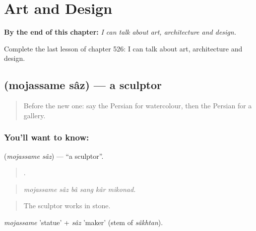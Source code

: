 
\chapter{Art and Design}
\label{ch:fa-art-and-design}

\begin{chapteropening}
\textbf{By the end of this chapter:} \emph{I can talk about art, architecture and design.}

Complete the last lesson of chapter 526: I can talk about art, architecture and design.
\end{chapteropening}

\section[\texorpdfstring{\fa{مجسمه} \fa{ساز} (mojassame sâz)}{مجسمه ساز (mojassame sâz)}]{  (mojassame sâz) — a sculptor}

\label{lesson:FA-C526-mojassame-saz}



\begin{quote}
Before the new one: say the Persian for watercolour, then the Persian for a gallery.
\end{quote}

\subsection*{You'll want to know:  }
\textbf{ } (\emph{mojassame sâz}) — \textquotedblleft{}a sculptor\textquotedblright{}.

\begin{quote}
     .
\end{quote}

\begin{quote}
\emph{mojassame sâz bâ sang kâr mikonad.}
\end{quote}

\begin{quote}
The sculptor works in stone.
\end{quote}

\emph{mojassame} 'statue' + \emph{sâz} 'maker' (stem of \emph{sâkhtan}).

